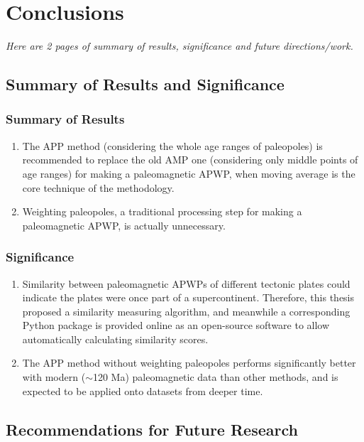 \chapter{Conclusions}\label{chap:Concl}
\textit{Here are 2 pages of summary of results, significance and
future directions/work.}
\vfill
\minitoc\newpage

\section{Summary of Results and Significance}

\subsection{Summary of Results}

\begin{enumerate}
  \item The APP method (considering the whole age ranges of paleopoles) is
  recommended to replace the old AMP one (considering only middle points of age
  ranges) for making a paleomagnetic APWP, when moving average is the core
  technique of the methodology.
  \item Weighting paleopoles, a traditional processing step for making a
  paleomagnetic APWP, is actually unnecessary.
\end{enumerate}

\subsection{Significance}

\begin{enumerate}
  \item Similarity between paleomagnetic APWPs of different tectonic plates
  could indicate the plates were once part of a supercontinent. Therefore, this
  thesis proposed a similarity measuring algorithm, and meanwhile a
  corresponding Python package is provided online as an open-source software to
  allow automatically calculating similarity scores.
  \item The APP method without weighting paleopoles performs significantly
  better with modern ($\sim$120 Ma) paleomagnetic data than other
  methods, and is expected to be applied onto datasets from deeper time.
\end{enumerate}

\section{Recommendations for Future Research}

